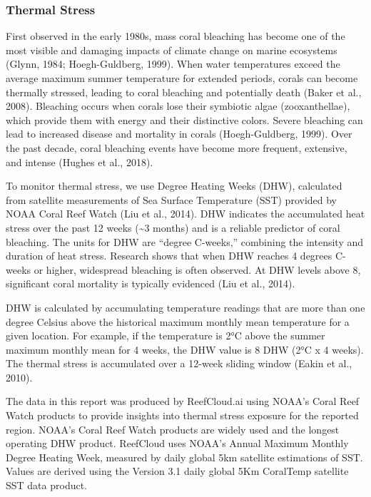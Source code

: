 \documentclass[
  letterpaper,
  DIV=11,
  numbers=noendperiod]{scrartcl}
\begin{document}
\subsubsection{Thermal Stress}\label{thermal-stress}

First observed in the early 1980s, mass coral bleaching has become one
of the most visible and damaging impacts of climate change on marine
ecosystems (Glynn, 1984; Hoegh-Guldberg, 1999). When water temperatures
exceed the average maximum summer temperature for extended periods,
corals can become thermally stressed, leading to coral bleaching and
potentially death (Baker et al., 2008). Bleaching occurs when corals
lose their symbiotic algae (zooxanthellae), which provide them with
energy and their distinctive colors. Severe bleaching can lead to
increased disease and mortality in corals (Hoegh-Guldberg, 1999). Over
the past decade, coral bleaching events have become more frequent,
extensive, and intense (Hughes et al., 2018).

To monitor thermal stress, we use Degree Heating Weeks (DHW), calculated
from satellite measurements of Sea Surface Temperature (SST) provided by
NOAA Coral Reef Watch (Liu et al., 2014). DHW indicates the accumulated
heat stress over the past 12 weeks (\textasciitilde3 months) and is a
reliable predictor of coral bleaching. The units for DHW are ``degree
C-weeks,'' combining the intensity and duration of heat stress. Research
shows that when DHW reaches 4 degrees C-weeks or higher, widespread
bleaching is often observed. At DHW levels above 8, significant coral
mortality is typically evidenced (Liu et al., 2014).

DHW is calculated by accumulating temperature readings that are more
than one degree Celsius above the historical maximum monthly mean
temperature for a given location. For example, if the temperature is 2°C
above the summer maximum monthly mean for 4 weeks, the DHW value is 8
DHW (2°C x 4 weeks). The thermal stress is accumulated over a 12-week
sliding window (Eakin et al., 2010).

The data in this report was produced by ReefCloud.ai using NOAA's Coral
Reef Watch products to provide insights into thermal stress exposure for
the reported region. NOAA's Coral Reef Watch products are widely used
and the longest operating DHW product. ReefCloud uses NOAA's Annual
Maximum Monthly Degree Heating Week, measured by daily global 5km
satellite estimations of SST. Values are derived using the Version 3.1
daily global 5Km CoralTemp satellite SST data product.
\end{document}

